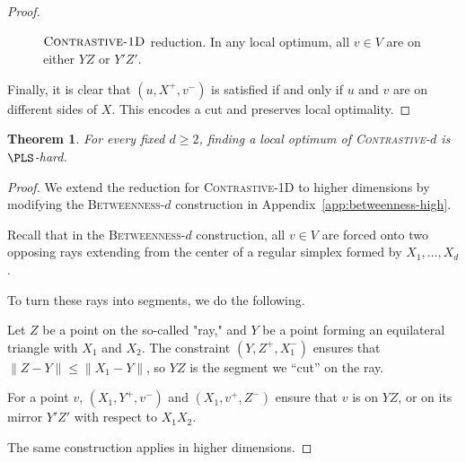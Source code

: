 \documentclass{article}
\theoremstyle{definition}  %
\theoremstyle{plain}
\newtheorem{theorem}{Theorem}
\numberwithin{observation}{section}
\numberwithin{claim}{section}
\numberwithin{fact}{section}
\numberwithin{lemma}{section}
\numberwithin{proposition}{section}
\numberwithin{theorem}{section}
\numberwithin{corollary}{section}
\numberwithin{definition}{section}
\theoremstyle{plain}
\begin{document}
\begin{proof}

\begin{figure}[h]
    \centering
    \caption{$\textsc{Contrastive-1D}$ reduction. In any local optimum, all $v \in V$ are on either $YZ$ or $Y'Z'$.}
    \label{fig:contrastive-1d}
\end{figure}

Finally, it is clear that $(u, X^+, v^-)$ is satisfied if and only if $u$ and $v$ are on different sides of $X$. This encodes a cut and preserves local optimality.
\end{proof}
\fi
\begin{theorem}\label{thm:contrastive-high}
For every fixed $d \geq 2$, finding a local optimum of \textsc{Contrastive-$d$} is $\PLS$-hard.
\end{theorem}

\begin{proof}

We extend the reduction for \textsc{Contrastive-1D} to higher dimensions by modifying the \textsc{Betweenness-$d$} construction in Appendix~\ref{app:betweenness-high}.

Recall that in the \textsc{Betweenness-$d$} construction, all $v \in V$ are forced onto two opposing rays extending from the center of a regular simplex formed by $X_1, \dots, X_d$.

To turn these rays into segments, we do the following.

Let $Z$ be a point on the so-called "ray," and $Y$ be a point forming an equilateral triangle with $X_1$ and $X_2$. The constraint $(Y, Z^+, X_1^-)$ ensures that $\|Z - Y\| \leq \|X_1 - Y\|$, so $YZ$ is the segment we ``cut'' on the ray.

For a point $v$, $(X_1, Y^+, v^-)$ and $(X_1, v^+, Z^-)$ ensure that $v$ is on $YZ$, or on its mirror $Y'Z'$ with respect to $X_1 X_2$.

The same construction applies in higher dimensions.
\end{proof}
\end{document}
